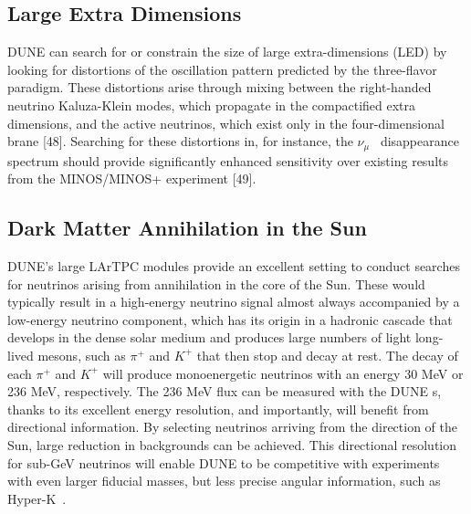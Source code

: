 \subsection{Large Extra Dimensions}
DUNE can search for or constrain the size of large extra-dimensions (LED) by looking for distortions of the oscillation pattern predicted by the three-flavor paradigm. These distortions arise through mixing between the right-handed neutrino Kaluza-Klein modes, which propagate in the compactified extra dimensions, and the active neutrinos, which exist only in the four-dimensional brane [48]. Searching for these distortions in, for instance, the $\nu_\mu$~ disappearance spectrum should provide significantly enhanced sensitivity over existing results from the MINOS/MINOS+ experiment [49].

\subsection{Dark Matter Annihilation in the Sun}
DUNE's large  LArTPC modules provide an excellent setting to conduct searches for neutrinos arising from  annihilation in the core of the Sun. These would typically result in a high-energy neutrino signal almost always accompanied by a low-energy neutrino component, which has its origin in a hadronic cascade that
develops in the dense solar medium and produces large numbers of light long-lived mesons, such as $\pi^+$ and $K^+$ that %
then stop and decay at rest. The decay of each $\pi^+$ and $K^+$ will
produce monoenergetic neutrinos with an energy 30 MeV or 236 MeV, respectively.
The 236 MeV flux can be measured with the DUNE s, thanks to its excellent energy resolution, and importantly, will benefit from directional information. By selecting neutrinos arriving from the direction of the Sun, large reduction in backgrounds can be achieved.
This directional resolution for sub-GeV neutrinos will enable DUNE to be competitive with experiments with even larger fiducial masses, but less precise angular information, such as Hyper-K~\cite{ref:DMannihilation}.

